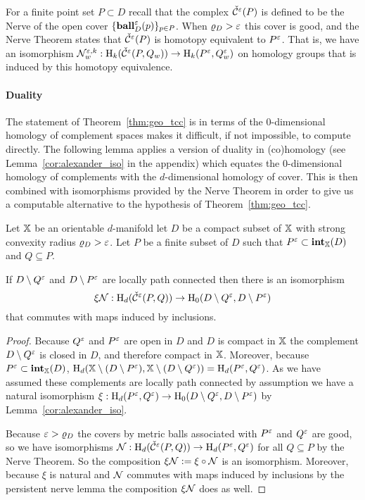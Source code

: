 
For a finite point set $P\subset D$ recall that the \Cech complex $\check{\mathcal{C}}^\varepsilon(P)$ is defined to be the Nerve of the open cover $\{\mathbf{ball}_D^\varepsilon(p)\}_{p\in P}$.
When $\varrho_D > \varepsilon$ this cover is good, and the Nerve Theorem states that $\check{\mathcal{C}}^\varepsilon(P)$ is homotopy equivalent to $P^\varepsilon$.
That is, we have an isomorphism $\mathcal{N}_w^{\varepsilon, k} : \mathrm{H}_k(\check{\mathcal{C}}^\varepsilon(P,Q_w))\to \mathrm{H}_k(P^\varepsilon, Q_w^\varepsilon)$ on homology groups that is induced by this homotopy equivalence.

\paragraph{Duality}

The statement of Theorem~\ref{thm:geo_tcc} is in terms of the $0$-dimensional homology of complement spaces makes it difficult, if not impossible, to compute directly.
The following lemma applies a version of duality in (co)homology (see Lemma~\ref{cor:alexander_iso} in the appendix) which equates the $0$-dimensional homology of complements with the $d$-dimensional homology of cover.
This is then combined with isomorphisms provided by the Nerve Theorem in order to give us a computable alternative to the hypothesis of Theorem~\ref{thm:geo_tcc}.

\begin{lemma}\label{lem:duality_apply}
  Let $\mathbb{X}$ be an orientable $d$-manifold let $D$ be a compact subset of $\mathbb{X}$ with strong convexity radius $\varrho_D > \varepsilon$.
  Let $P$ be a finite subset of $D$ such that $P^\varepsilon\subset \mathbf{int}_{\mathbb{X}}(D)$ and $Q\subseteq P$.

  If $D\setminus Q^\varepsilon$ and $D\setminus P^\varepsilon$ are locally path connected then there is an isomorphism
  \[ \xi\mathcal{N} : \mathrm{H}_d(\check{\mathcal{C}}^\varepsilon(P,Q))\to \mathrm{H}_0(D\setminus Q^\varepsilon, D\setminus P^\varepsilon)\]
  that commutes with maps induced by inclusions.
\end{lemma}
\begin{proof}
  Because $Q^\varepsilon$ and $P^\varepsilon$ are open in $D$ and $D$ is compact in $\mathbb{X}$ the complement $D\setminus Q^\varepsilon$ is closed in $D$, and therefore compact in $\mathbb{X}$.
  Moreover, because $P^\varepsilon\subset \mathbf{int}_{\mathbb{X}}(D)$, $\mathrm{H}_d(\mathbb{X}\setminus(D\setminus P^\varepsilon), \mathbb{X}\setminus(D\setminus Q^\varepsilon)) = \mathrm{H}_d(P^\varepsilon, Q^\varepsilon)$.
  As we have assumed these complements are locally path connected by assumption we have a natural isomorphism $\xi : \mathrm{H}_d(P^\varepsilon, Q^\varepsilon)\to \mathrm{H}_0(D\setminus Q^\varepsilon, D\setminus P^\varepsilon)$
  by Lemma~\ref{cor:alexander_iso}.

  Because $\varepsilon > \varrho_D$ the covers by metric balls associated with $P^\varepsilon$ and $Q^\varepsilon$ are good, so we have isomorphisms $\mathcal{N} : \mathrm{H}_d(\check{\mathcal{C}}^\varepsilon(P, Q))\to \mathrm{H}_d(P^\varepsilon, Q^\varepsilon)$ for all $Q\subseteq P$ by the Nerve Theorem.
  So the composition $\xi\mathcal{N} := \xi\circ\mathcal{N}$ is an isomorphism.
  Moreover, because $\xi$ is natural and $\mathcal{N}$ commutes with maps induced by inclusions by the persistent nerve lemma the composition $\xi\mathcal{N}$ does as well.
\end{proof}

